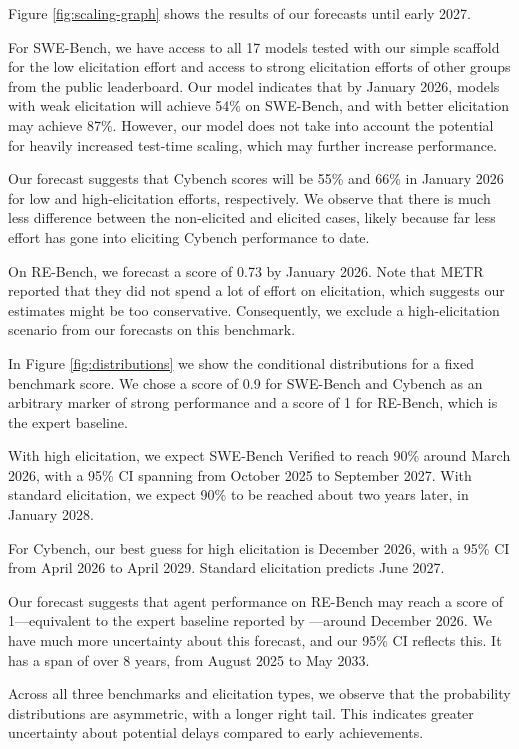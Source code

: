Figure \ref{fig:scaling-graph} shows the results of our forecasts until early 2027.

For SWE-Bench, we have access to all 17 models tested with our simple scaffold for the low elicitation effort and access to strong elicitation efforts of other groups from the public leaderboard.
Our model indicates that by January 2026, models with weak elicitation will achieve 54\% on SWE-Bench, and with better elicitation may achieve 87\%. However, our model does not take into account the potential for heavily increased test-time scaling, which may further increase performance.

Our forecast suggests that Cybench scores will be 55\% and 66\% in January 2026 for low and high-elicitation efforts, respectively. We observe that there is much less difference between the non-elicited and elicited cases, likely because far less effort has gone into eliciting Cybench performance to date.

On RE-Bench, we forecast a score of 0.73 by January 2026. Note that METR reported that they did not spend a lot of effort on elicitation, which suggests our estimates might be too conservative. Consequently, we exclude a high-elicitation scenario from our forecasts on this benchmark.


In Figure \ref{fig:distributions} we show the conditional distributions for a fixed benchmark score. We chose a score of 0.9 for SWE-Bench and Cybench as an arbitrary marker of strong performance and a score of 1 for RE-Bench, which is the expert baseline. 

With high elicitation, we expect SWE-Bench Verified to reach 90\% around March 2026, with a 95\% CI spanning from October 2025 to September 2027. With standard elicitation, we expect 90\% to be reached about two years later, in January 2028.

For Cybench, our best guess for high elicitation is December 2026, with a 95\% CI from April 2026 to April 2029. Standard elicitation predicts June 2027. 

Our forecast suggests that agent performance on RE-Bench may reach a score of 1—equivalent to the expert baseline reported by \citet{wijk2024rebenchevaluatingfrontierai}—around December 2026. We have much more uncertainty about this forecast, and our 95\% CI reflects this. It has a span of over 8 years, from August 2025 to May 2033. 

Across all three benchmarks and elicitation types, we observe that the probability distributions are asymmetric, with a longer right tail. This indicates greater uncertainty about potential delays compared to early achievements.

